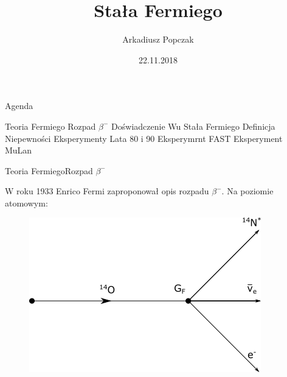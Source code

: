\documentclass{beamer}
\title{Stała Fermiego}
\date{22.11.2018}
\author{Arkadiusz Popczak}
\begin{document}
\begin{frame}
    \maketitle
\end{frame}

\begin{frame}{Agenda}

    \begin{outline}[enumerate]

        \1 Teoria Fermiego
            \2 Rozpad $\beta^-$
            \2 Doświadczenie Wu
        \1 Stała Fermiego
            \2 Definicja
            \2 Niepewności
        \1 Eksperymenty
            \2 Lata 80 i 90
            \2 Eksperymrnt FAST
            \2 Eksperyment MuLan


    \end{outline}

\end{frame}

\begin{frame}{Teoria Fermiego}{Rozpad $\beta^-$}

    W roku 1933 Enrico Fermi \cite{fermi} zaproponował opis rozpadu $\beta^-$. Na poziomie atomowym:

    \begin{figure}

        \includegraphics{4points.png}

    \end{figure}

\end{frame}
\end{document}
